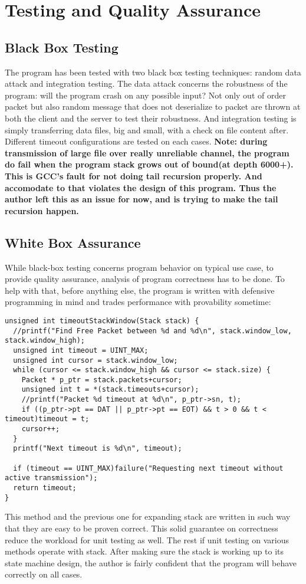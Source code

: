 \documentclass[12pt]{article}
\begin{document}
\section{Testing and Quality Assurance}
\subsection{Black Box Testing}
The program has been tested with two black box testing techniques: random data attack and integration testing. The data attack concerns the robustness of the program: will the program crash on any possible input? Not only out of order packet but also random message that does not deserialize to packet are thrown at both the client and the server to test their robustness. And integration testing is simply transferring data files, big and small, with a check on file content after. Different timeout configurations are tested on each cases. \textbf{Note: during transmission of large file over really unreliable channel, the program do fail when the program stack grows out of bound(at depth 6000+). This is GCC's fault for not doing tail recursion properly. And accomodate to that violates the design of this program. Thus the author left this as an issue for now, and is trying to make the tail recursion happen.}

\subsection{White Box Assurance}
While black-box testing concerns program behavior on typical use case, to provide quality assurance, analysis of program correctness has to be done. To help with that, before anything else, the program is written with defensive programming in mind and trades performance with provability sometime:
\begin{samepage}
\begin{verbatim}
unsigned int timeoutStackWindow(Stack stack) {
  //printf("Find Free Packet between %d and %d\n", stack.window_low, stack.window_high);
  unsigned int timeout = UINT_MAX;
  unsigned int cursor = stack.window_low;
  while (cursor <= stack.window_high && cursor <= stack.size) {
    Packet * p_ptr = stack.packets+cursor;
    unsigned int t = *(stack.timeouts+cursor);
    //printf("Packet %d timeout at %d\n", p_ptr->sn, t);
    if ((p_ptr->pt == DAT || p_ptr->pt == EOT) && t > 0 && t < timeout)timeout = t;
    cursor++;
  }
  printf("Next timeout is %d\n", timeout);
  
  if (timeout == UINT_MAX)failure("Requesting next timeout without active transmission");
  return timeout;
}
\end{verbatim}
\end{samepage}
This method and the previous one for expanding stack are written in such way that they are easy to be proven correct. This solid guarantee on correctness reduce the workload for unit testing as well. The rest if unit testing on various methods operate with stack. After making sure the stack is working up to its state machine design, the author is fairly confident that the program will behave correctly on all cases.
\end{document}
